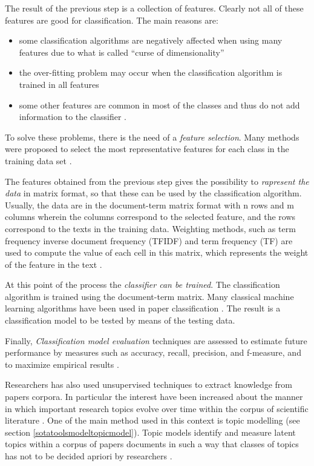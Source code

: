 \documentclass[b5paper,]{book}
\theoremstyle{definition}
\theoremstyle{definition}
\theoremstyle{definition}
\theoremstyle{remark}
\begin{document}
The result of the previous step is a collection of features. Clearly not
all of these features are good for classification. The main reasons are:

\begin{itemize}
\item
  some classification algorithms are negatively affected when using many
  features due to what is called ``curse of dimensionality''
\item
  the over-fitting problem may occur when the classification algorithm
  is trained in all features
\item
  some other features are common in most of the classes and thus do not
  add information to the classifier .
\end{itemize}

To solve these problems, there is the need of a \emph{feature
selection}. Many methods were proposed to select the most representative
features for each class in the training data set
\citep{zhao2012r, weiss2010text, weiss2015fundamentals}.

The features obtained from the previous step gives the possibility to
\emph{rapresent the data} in matrix format, so that these can be used by
the classification algorithm. Usually, the data are in the document-term
matrix format with n rows and m columns wherein the columns correspond
to the selected feature, and the rows correspond to the texts in the
training data. Weighting methods, such as term frequency inverse
document frequency (TFIDF) and term frequency (TF) are used to compute
the value of each cell in this matrix, which represents the weight of
the feature in the text \citep{meyer2008text}.

At this point of the process the \emph{classifier can be trained}. The
classification algorithm is trained using the document-term matrix. Many
classical machine learning algorithms have been used in paper
classification
\citep{hotho2005brief, aphinyanaphongs2003text, zhao2012r}. The result
is a classification model to be tested by means of the testing data.

Finally, \emph{Classification model evaluation} techniques are assessed
to estimate future performance by measures such as accuracy, recall,
precision, and f-measure, and to maximize empirical results
\citep{weiss2015fundamentals}.

Researchers has also used unsupervised techniques to extract knowledge
from papers corpora. In particular the interest have been increased
about the manner in which important research topics evolve over time
within the corpus of scientific literature \citep{zhou2017topic}. One of
the main method used in this context is topic modelling (see section
\ref{sotatoolsmodeltopicmodel}). Topic models identify and measure
latent topics within a corpus of papers documents
\citep{seaghdha2014unsupervised} in such a way that classes of topics
has not to be decided apriori by researchers
\citep{gargiulo2017deep, yang2016discriminative, paraschiv2015semantic}.
\end{document}
